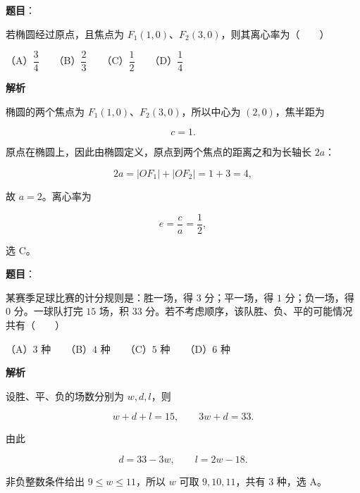 \begin{answer}

\textbf{题目}：

若椭圆经过原点，且焦点为 $F_1(1,0)$、$F_2(3,0)$，则其离心率为\mbox{（　　）}

（A）$\dfrac34$　　（B）$\dfrac23$　　（C）$\dfrac12$　　（D）$\dfrac14$

\textbf{解析}

椭圆的两个焦点为 $F_1(1,0)$、$F_2(3,0)$，所以中心为 $(2,0)$，焦半距为

\nopagebreak[4]
\[
c=1.
\]

原点在椭圆上，因此由椭圆定义，原点到两个焦点的距离之和为长轴长 $2a$：

\nopagebreak[4]
\[
2a=|OF_1|+|OF_2|=1+3=4,
\]

故 $a=2$。离心率为

\nopagebreak[4]
\[
e=\frac ca=\frac12,
\]

选 C。


\end{answer}
\begin{answer}

\textbf{题目}：

某赛季足球比赛的计分规则是：胜一场，得 $3$ 分；平一场，得 $1$ 分；负一场，得 $0$ 分。一球队打完 $15$ 场，积 $33$ 分。若不考虑顺序，该队胜、负、平的可能情况共有\mbox{（　　）}

（A）$3$ 种　　（B）$4$ 种　　（C）$5$ 种　　（D）$6$ 种

\textbf{解析}

设胜、平、负的场数分别为 $w,d,l$，则

\nopagebreak[4]
\[
w+d+l=15,\qquad 3w+d=33.
\]

由此

\nopagebreak[4]
\[
d=33-3w,\qquad l=2w-18.
\]

非负整数条件给出 $9\le w\le11$，所以 $w$ 可取 $9,10,11$，共有 $3$ 种，选 A。


\end{answer}
